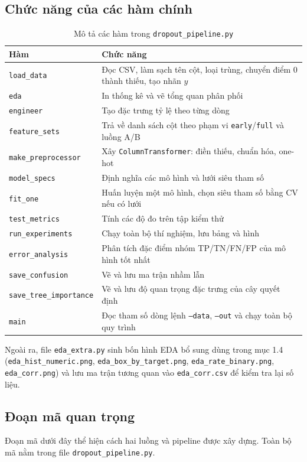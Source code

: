 \documentclass[12pt,a4paper]{article}
\begin{document}
\subsection{Chức năng của các hàm chính}
\begin{table}[H]
\centering
\caption{Mô tả các hàm trong \texttt{dropout\_pipeline.py}}
\label{tab:funcs}
\begin{tabular}{p{4.6cm}p{9.2cm}}
\toprule
Hàm & Chức năng \\
\midrule
\texttt{load\_data} & Đọc CSV, làm sạch tên cột, loại trùng, chuyển điểm 0 thành thiếu, tạo nhãn $y$ \\
\texttt{eda} & In thống kê và vẽ tổng quan phân phối \\
\texttt{engineer} & Tạo đặc trưng tỷ lệ theo từng dòng \\
\texttt{feature\_sets} & Trả về danh sách cột theo phạm vi \texttt{early}/\texttt{full} và luồng A/B \\
\texttt{make\_preprocessor} & Xây \texttt{ColumnTransformer}: điền thiếu, chuẩn hóa, one-hot \\
\texttt{model\_specs} & Định nghĩa các mô hình và lưới siêu tham số \\
\texttt{fit\_one} & Huấn luyện một mô hình, chọn siêu tham số bằng CV nếu có lưới \\
\texttt{test\_metrics} & Tính các độ đo trên tập kiểm thử \\
\texttt{run\_experiments} & Chạy toàn bộ thí nghiệm, lưu bảng và hình \\
\texttt{error\_analysis} & Phân tích đặc điểm nhóm TP/TN/FN/FP của mô hình tốt nhất \\
\texttt{save\_confusion} & Vẽ và lưu ma trận nhầm lẫn \\
\texttt{save\_tree\_importance} & Vẽ và lưu độ quan trọng đặc trưng của cây quyết định \\
\texttt{main} & Đọc tham số dòng lệnh \texttt{--data}, \texttt{--out} và chạy toàn bộ quy trình \\
\bottomrule
\end{tabular}
\end{table}

Ngoài ra, file \texttt{eda\_extra.py} sinh bốn hình EDA bổ sung dùng trong mục 1.4 (\texttt{eda\_hist\_numeric.png}, \texttt{eda\_box\_by\_target.png}, \texttt{eda\_rate\_binary.png}, \texttt{eda\_corr.png}) và lưu ma trận tương quan vào \texttt{eda\_corr.csv} để kiểm tra lại số liệu.

\subsection{Đoạn mã quan trọng}
Đoạn mã dưới đây thể hiện cách hai luồng và pipeline được xây dựng. Toàn bộ mã nằm trong file \texttt{dropout\_pipeline.py}.
\end{document}
